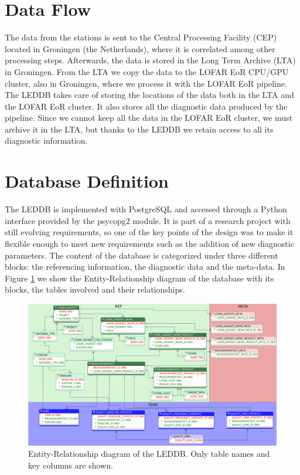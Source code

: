 \section{Data Flow}
The data from the stations is sent to the Central Processing Facility (CEP) located in Groningen (the Netherlands), where it is correlated among other processing steps. Afterwards, the data is stored in the Long Term Archive (LTA) in Groningen. From the LTA we copy the data to the LOFAR EoR CPU/GPU cluster, also in Groningen, where we process it with the LOFAR EoR pipeline. The LEDDB takes care of storing the locations of the data both in the LTA and the LOFAR EoR cluster. It also stores all the diagnostic data produced by the pipeline. Since we cannot keep all the data in the LOFAR EoR cluster, we must archive it in the LTA, but thanks to the LEDDB we retain access to all its diagnostic information.

\section{Database Definition} 

The LEDDB is implemented with PostgreSQL and accessed through a Python interface provided by the psycopg2 module. It is part of a research project with still evolving requirements, so one of the key points of the design was to make it flexible enough to meet new requirements such as the addition of new diagnostic parameters. The content of the database is categorized under three different blocks: the referencing information, the diagnostic data and the meta-data. In Figure \ref{fig:leddber} we show the Entity-Relationship diagram of the database with its blocks, the tables involved and their relationships.
\begin{figure}[!ht]
  \centering
    \includegraphics[scale=0.077]{part10/Martinez-rubi_O23/O23_f1.eps} 
  \caption{Entity-Relationship diagram of the LEDDB. Only table names and key columns are shown.}
  \label{fig:leddber}
\end{figure}

